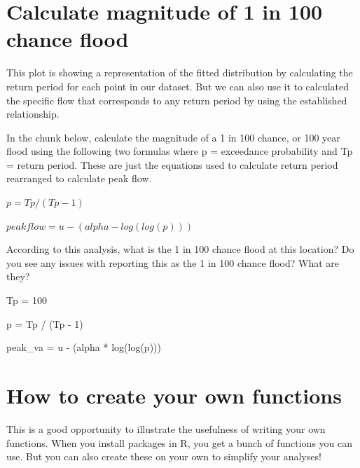 \documentclass[
]{book}
\newenvironment{Shaded}{\begin{snugshade}}{\end{snugshade}}
\newcommand{\DecValTok}[1]{\textcolor[rgb]{0.00,0.00,0.81}{#1}}
\newcommand{\FunctionTok}[1]{\textcolor[rgb]{0.00,0.00,0.00}{#1}}
\newcommand{\NormalTok}[1]{#1}
\newcommand{\OtherTok}[1]{\textcolor[rgb]{0.56,0.35,0.01}{#1}}
\newcommand{\SpecialCharTok}[1]{\textcolor[rgb]{0.00,0.00,0.00}{#1}}
\begin{document}
\hypertarget{calculate-magnitude-of-1-in-100-chance-flood}{%
\section{Calculate magnitude of 1 in 100 chance flood}\label{calculate-magnitude-of-1-in-100-chance-flood}}

This plot is showing a representation of the fitted distribution by calculating the return period for each point in our dataset. But we can also use it to calculated the specific flow that corresponds to any return period by using the established relationship.

In the chunk below, calculate the magnitude of a 1 in 100 chance, or 100 year flood using the following two formulas where p = exceedance probability and Tp = return period. These are just the equations used to calculate return period rearranged to calculate peak flow.

\(p = Tp / (Tp - 1)\)

\(peakflow = u - (alpha - log(log(p)))\)

According to this analysis, what is the 1 in 100 chance flood at this location? Do you see any issues with reporting this as the 1 in 100 chance flood? What are they?

\begin{Shaded}
\begin{Highlighting}[]
\NormalTok{Tp }\OtherTok{=} \DecValTok{100}

\NormalTok{p }\OtherTok{=}\NormalTok{ Tp }\SpecialCharTok{/}\NormalTok{ (Tp }\SpecialCharTok{{-}} \DecValTok{1}\NormalTok{)}

\NormalTok{peak\_va }\OtherTok{=}\NormalTok{ u }\SpecialCharTok{{-}}\NormalTok{ (alpha }\SpecialCharTok{*} \FunctionTok{log}\NormalTok{(}\FunctionTok{log}\NormalTok{(p)))}
\end{Highlighting}
\end{Shaded}

\hypertarget{how-to-create-your-own-functions}{%
\section{How to create your own functions}\label{how-to-create-your-own-functions}}

This is a good opportunity to illustrate the usefulness of writing your own functions. When you install packages in R, you get a bunch of functions you can use. But you can also create these on your own to simplify your analyses!
\end{document}
